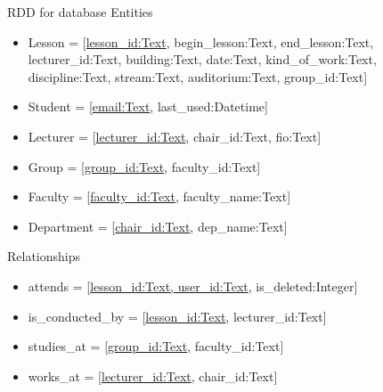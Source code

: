 \documentclass{scrreprt}
\begin{document}
RDD for database
Entities
\begin{itemize}
\item Lesson = {[\underline{lesson_id:Text}, begin_lesson:Text, end_lesson:Text, lecturer_id:Text, building:Text, date:Text, kind_of_work:Text, discipline:Text, stream:Text, auditorium:Text, group_id:Text]} 
\item Student = {[\underline{email:Text}, last_used:Datetime]}
\item Lecturer = {[\underline{lecturer_id:Text}, chair_id:Text, fio:Text]}
\item Group = {[\underline{group_id:Text}, faculty_id:Text]}
\item Faculty = {[\underline{faculty_id:Text}, faculty_name:Text]}  
\item Department = {[\underline{chair_id:Text}, dep_name:Text]}  
\end{itemize}

Relationships
\begin{itemize}
\item attends = {[\underline{lesson_id:Text, user_id:Text}, is_deleted:Integer]}
\item is_conducted_by = {[\underline{lesson_id:Text}, lecturer_id:Text]}
\item studies_at = {[\underline{group_id:Text}, faculty_id:Text]}
\item works_at = {[\underline{lecturer_id:Text}, chair_id:Text]}
\end{itemize}
\end{document}
